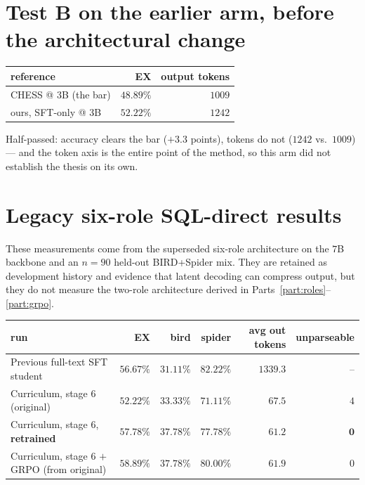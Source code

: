 \documentclass[11pt]{article}
\theoremstyle{definition}
\begin{document}
\begin{center}
\end{center}

\section{Test B on the earlier arm, before the architectural change}

\begin{center}
\begin{tabular}{lrr}
\toprule
reference & EX & output tokens \\
\midrule
CHESS @ 3B (the bar) & $48.89\%$ & $1009$ \\
ours, SFT-only @ 3B  & $52.22\%$ & $1242$ \\
\bottomrule
\end{tabular}
\end{center}

Half-passed: accuracy clears the bar ($+3.3$ points), tokens do not ($1242$ vs.\ $1009$) --- and the token axis is the entire point of the method, so this arm did not establish the thesis on its own.

\section{Legacy six-role SQL-direct results}

These measurements come from the superseded six-role architecture on the $7$B backbone and an $n=90$ held-out BIRD+Spider mix. They are retained as development history and evidence that latent decoding can compress output, but they do not measure the two-role architecture derived in Parts~\ref{part:roles}--\ref{part:grpo}.

\begin{center}
\small
\begin{tabular}{lrrrrr}
\toprule
run & EX & bird & spider & avg out tokens & unparseable\\
\midrule
Previous full-text SFT student & $56.67\%$ & $31.11\%$ & $82.22\%$ & $1339.3$ & --\\
Curriculum, stage 6 (original)   & $52.22\%$ & $33.33\%$ & $71.11\%$ & $67.5$ & $4$\\
Curriculum, stage 6, \textbf{retrained} & $\mathbf{57.78\%}$ & $\mathbf{37.78\%}$ & $\mathbf{77.78\%}$ & $\mathbf{61.2}$ & $\mathbf{0}$\\
Curriculum, stage 6 $+$ GRPO (from original) & $\mathbf{58.89\%}$ & $37.78\%$ & $\mathbf{80.00\%}$ & $61.9$ & $0$\\
\bottomrule
\end{tabular}
\end{center}
\end{document}
